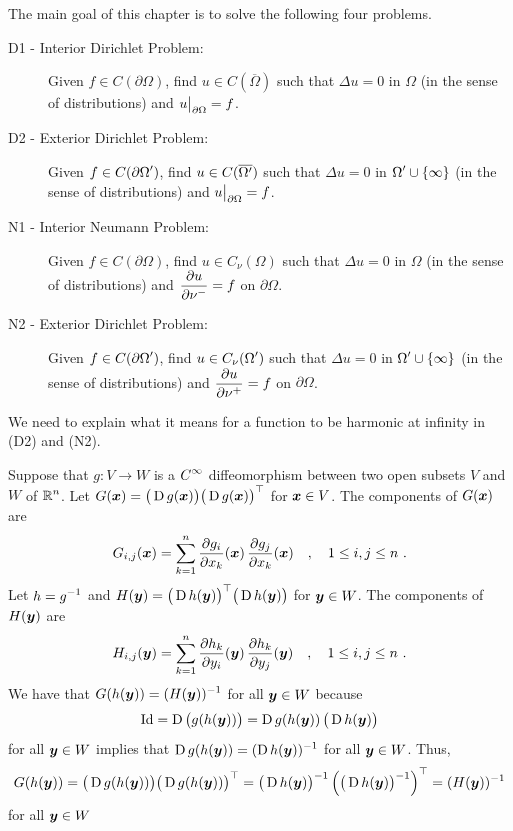 The main goal of this chapter is to solve the following four problems.
\begin{description}
\item[D1 - Interior Dirichlet Problem:] Given
$f\in C(\partial \Omega)$, find $u \in C(\overline{\Omega})$ 
such that $\Delta u = 0$ in $\Omega$ (in the sense of distributions)
and $\displaystyle u\big|_{\partial \Omega} = f$.
\item[D2 - Exterior Dirichlet Problem:] Given
$\displaystyle f\in C(\partial \Omega^{\prime})$, find
$\displaystyle u \in C(\overline{\Omega^{\prime}})$
such that $\Delta u = 0$ in
$\displaystyle \Omega^{\prime} \cup \{\infty\}$ (in the sense of
distributions) and $\displaystyle u\big|_{\partial \Omega} = f$.
\item[N1 - Interior Neumann Problem:] Given
$f\in C(\partial \Omega)$, find $u \in C_{\nu}(\Omega)$ 
such that $\Delta u = 0$ in $\Omega$ (in the sense of distributions)
and $\displaystyle \frac{\partial{u}}{\partial \nu^-} = f$ on $\partial \Omega$.
\item[N2 - Exterior Dirichlet Problem:] Given
$\displaystyle f\in C(\partial \Omega^{\prime})$, find
$\displaystyle u \in C_{\nu}(\Omega^{\prime})$
such that $\Delta u = 0$ in
$\displaystyle \Omega^{\prime} \cup \{\infty\}$ (in the sense of
distributions) and $\displaystyle \frac{\partial{u}}{\partial \nu^+} = f$ on
$\partial \Omega$.
\end{description}

We need to explain what it means for a function to be harmonic at
infinity in (D2) and (N2).

Suppose that $g: V\rightarrow W$ is a $\displaystyle C^\infty$ diffeomorphism
between two open subsets $V$ and $W$ of $\displaystyle \mathbb{R}^n$.
Let $\displaystyle G({\bm{x}}) = \big(\operatorname{D} g({\bm{x}})\big)
\big(\operatorname{D} g({\bm{x}})\big)^\top$ for
${\bm{x}} \in V$.  The components of $G({\bm{x}})$ are
\[
G_{i,j}({\bm{x}}) = \sum_{k=1}^n \frac{\partial{g_i}}{\partial x_k}({\bm{x}})\,
\frac{\partial{g_j}}{\partial x_k}({\bm{x}}) \quad , \quad
1 \leq i,j \leq n \ .
\]
Let $\displaystyle h = g^{-1}$ and
$\displaystyle H({\bm{y}}) = \big(\operatorname{D} h({\bm{y}})\big)^\top
\big(\operatorname{D} h({\bm{y}})\big)$ for ${\bm{y}} \in W$.  The components of
$H({\bm{y}})$ are
\[
H_{i,j}({\bm{y}}) = \sum_{k=1}^n \frac{\partial{h_k}}{\partial y_i}({\bm{y}})\,
\frac{\partial{h_k}}{\partial y_j}({\bm{y}}) \quad , \quad
1 \leq i,j \leq n \ .
\]
We have that
$\displaystyle G(h({\bm{y}})) = (H({\bm{y}}))^{-1}$ for all ${\bm{y}} \in W$
because
\[
\operatorname{Id} = \operatorname{D} \big( g(h({\bm{y}})) \big) = \operatorname{D} g(h({\bm{y}}))
\,\big(\operatorname{D} h({\bm{y}}) \big)
\]
for all ${\bm{y}} \in W$ implies that
$\displaystyle \operatorname{D} g(h({\bm{y}})) = (\operatorname{D} h({\bm{y}}))^{-1}$
for all ${\bm{y}} \in W$.  Thus,
\[
G(h({\bm{y}})) = \big(\operatorname{D} g(h({\bm{y}}))\big)
\big(\operatorname{D} g(h({\bm{y}}))\big)^\top
= \big(\operatorname{D} h({\bm{y}})\big)^{-1}
\left( \big(\operatorname{D} h({\bm{y}}) \big)^{-1}\right)^\top
= (H({\bm{y}}))^{-1}
\]
for all ${\bm{y}} \in W$


